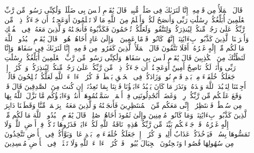 \stopbuffer
\startbuffer[\q:7:60]
قَالَ ٱلۡمَلَأُ مِن قَوۡمِهِۦۤ إِنَّا لَنَرَىٰكَ فِی ضَلَٰلࣲ مُّبِینࣲ%
\stopbuffer
\startbuffer[\q:7:61]
قَالَ یَٰقَوۡمِ لَیۡسَ بِی ضَلَٰلَةࣱ وَلَٰكِنِّی رَسُولࣱ مِّن رَّبِّ ٱلۡعَٰلَمِینَ%
\stopbuffer
\startbuffer[\q:7:62]
أُبَلِّغُكُمۡ رِسَٰلَٰتِ رَبِّی وَأَنصَحُ لَكُمۡ وَأَعۡلَمُ مِنَ ٱللَّهِ مَا لَا تَعۡلَمُونَ%
\stopbuffer
\startbuffer[\q:7:63]
أَوَعَجِبۡتُمۡ أَن جَاۤءَكُمۡ ذِكۡرࣱ مِّن رَّبِّكُمۡ عَلَىٰ رَجُلࣲ مِّنكُمۡ لِیُنذِرَكُمۡ وَلِتَتَّقُوا۟ وَلَعَلَّكُمۡ تُرۡحَمُونَ%
\stopbuffer
\startbuffer[\q:7:64]
فَكَذَّبُوهُ فَأَنجَیۡنَٰهُ وَٱلَّذِینَ مَعَهُۥ فِی ٱلۡفُلۡكِ وَأَغۡرَقۡنَا ٱلَّذِینَ كَذَّبُوا۟ بِءَایَٰتِنَاۤۚ إِنَّهُمۡ كَانُوا۟ قَوۡمًا عَمِینَ%
\stopbuffer
\startbuffer[\q:7:65]
۞ وَإِلَىٰ عَادٍ أَخَاهُمۡ هُودࣰاۚ قَالَ یَٰقَوۡمِ ٱعۡبُدُوا۟ ٱللَّهَ مَا لَكُم مِّنۡ إِلَٰهٍ غَیۡرُهُۥۤۚ أَفَلَا تَتَّقُونَ%
\stopbuffer
\startbuffer[\q:7:66]
قَالَ ٱلۡمَلَأُ ٱلَّذِینَ كَفَرُوا۟ مِن قَوۡمِهِۦۤ إِنَّا لَنَرَىٰكَ فِی سَفَاهَةࣲ وَإِنَّا لَنَظُنُّكَ مِنَ ٱلۡكَٰذِبِینَ%
\stopbuffer
\startbuffer[\q:7:67]
قَالَ یَٰقَوۡمِ لَیۡسَ بِی سَفَاهَةࣱ وَلَٰكِنِّی رَسُولࣱ مِّن رَّبِّ ٱلۡعَٰلَمِینَ%
\stopbuffer
\startbuffer[\q:7:68]
أُبَلِّغُكُمۡ رِسَٰلَٰتِ رَبِّی وَأَنَا۠ لَكُمۡ نَاصِحٌ أَمِینٌ%
\stopbuffer
\startbuffer[\q:7:69]
أَوَعَجِبۡتُمۡ أَن جَاۤءَكُمۡ ذِكۡرࣱ مِّن رَّبِّكُمۡ عَلَىٰ رَجُلࣲ مِّنكُمۡ لِیُنذِرَكُمۡۚ وَٱذۡكُرُوۤا۟ إِذۡ جَعَلَكُمۡ خُلَفَاۤءَ مِنۢ بَعۡدِ قَوۡمِ نُوحࣲ وَزَادَكُمۡ فِی ٱلۡخَلۡقِ بَصۜۡطَةࣰۖ فَٱذۡكُرُوۤا۟ ءَالَاۤءَ ٱللَّهِ لَعَلَّكُمۡ تُفۡلِحُونَ%
\stopbuffer
\startbuffer[\q:7:70]
قَالُوۤا۟ أَجِئۡتَنَا لِنَعۡبُدَ ٱللَّهَ وَحۡدَهُۥ وَنَذَرَ مَا كَانَ یَعۡبُدُ ءَابَاۤؤُنَا فَأۡتِنَا بِمَا تَعِدُنَاۤ إِن كُنتَ مِنَ ٱلصَّٰدِقِینَ%
\stopbuffer
\startbuffer[\q:7:71]
قَالَ قَدۡ وَقَعَ عَلَیۡكُم مِّن رَّبِّكُمۡ رِجۡسࣱ وَغَضَبٌۖ أَتُجَٰدِلُونَنِی فِیۤ أَسۡمَاۤءࣲ سَمَّیۡتُمُوهَاۤ أَنتُمۡ وَءَابَاۤؤُكُم مَّا نَزَّلَ ٱللَّهُ بِهَا مِن سُلۡطَٰنࣲۚ فَٱنتَظِرُوۤا۟ إِنِّی مَعَكُم مِّنَ ٱلۡمُنتَظِرِینَ%
\stopbuffer
\startbuffer[\q:7:72]
فَأَنجَیۡنَٰهُ وَٱلَّذِینَ مَعَهُۥ بِرَحۡمَةࣲ مِّنَّا وَقَطَعۡنَا دَابِرَ ٱلَّذِینَ كَذَّبُوا۟ بِءَایَٰتِنَاۖ وَمَا كَانُوا۟ مُؤۡمِنِینَ%
\stopbuffer
\startbuffer[\q:7:73]
وإِلَىٰ ثَمُودَ أَخَاهُمۡ صَٰلِحࣰاۚ قَالَ یَٰقَوۡمِ ٱعۡبُدُوا۟ ٱللَّهَ مَا لَكُم مِّنۡ إِلَٰهٍ غَیۡرُهُۥۖ قَدۡ جَاۤءَتۡكُم بَیِّنَةࣱ مِّن رَّبِّكُمۡۖ هَٰذِهِۦ نَاقَةُ ٱللَّهِ لَكُمۡ ءَایَةࣰۖ فَذَرُوهَا تَأۡكُلۡ فِیۤ أَرۡضِ ٱللَّهِۖ وَلَا تَمَسُّوهَا بِسُوۤءࣲ فَیَأۡخُذَكُمۡ عَذَابٌ أَلِیمࣱ%
\stopbuffer
\startbuffer[\q:7:74]
وَٱذۡكُرُوۤا۟ إِذۡ جَعَلَكُمۡ خُلَفَاۤءَ مِنۢ بَعۡدِ عَادࣲ وَبَوَّأَكُمۡ فِی ٱلۡأَرۡضِ تَتَّخِذُونَ مِن سُهُولِهَا قُصُورࣰا وَتَنۡحِتُونَ ٱلۡجِبَالَ بُیُوتࣰاۖ فَٱذۡكُرُوۤا۟ ءَالَاۤءَ ٱللَّهِ وَلَا تَعۡثَوۡا۟ فِی ٱلۡأَرۡضِ مُفۡسِدِینَ%
